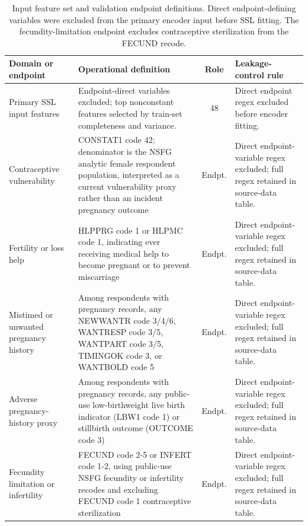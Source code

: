 \begin{table}[tbp]
\centering
\caption{Input feature set and validation endpoint definitions. Direct endpoint-defining variables were excluded from the primary encoder input before SSL fitting. The fecundity-limitation endpoint excludes contraceptive sterilization from the FECUND recode.}
\label{tab:endpoints}
\scriptsize
\setlength{\tabcolsep}{4pt}
\begin{tabular*}{\textwidth}{@{\extracolsep{\fill}}>{\raggedright\arraybackslash}p{}>{\raggedright\arraybackslash}p{}c>{\raggedright\arraybackslash}p{}@{}}
\toprule
Domain or endpoint & Operational definition & Role & Leakage-control rule \\
\midrule
Primary SSL input features & Endpoint-direct variables excluded; top nonconstant features selected by train-set completeness and variance. & 48 & Direct endpoint regex excluded before encoder fitting. \\
Contraceptive vulnerability & CONSTAT1 code 42; denominator is the NSFG analytic female respondent population, interpreted as a current vulnerability proxy rather than an incident pregnancy outcome & Endpt. & Direct endpoint-variable regex excluded; full regex retained in source-data table. \\
Fertility or loss help & HLPPRG code 1 or HLPMC code 1, indicating ever receiving medical help to become pregnant or to prevent miscarriage & Endpt. & Direct endpoint-variable regex excluded; full regex retained in source-data table. \\
Mistimed or unwanted pregnancy history & Among respondents with pregnancy records, any NEWWANTR code 3/4/6, WANTRESP code 3/5, WANTPART code 3/5, TIMINGOK code 3, or WANTBOLD code 5 & Endpt. & Direct endpoint-variable regex excluded; full regex retained in source-data table. \\
Adverse pregnancy-history proxy & Among respondents with pregnancy records, any public-use low-birthweight live birth indicator (LBW1 code 1) or stillbirth outcome (OUTCOME code 3) & Endpt. & Direct endpoint-variable regex excluded; full regex retained in source-data table. \\
Fecundity limitation or infertility & FECUND code 2-5 or INFERT code 1-2, using public-use NSFG fecundity or infertility recodes and excluding FECUND code 1 contraceptive sterilization & Endpt. & Direct endpoint-variable regex excluded; full regex retained in source-data table. \\
\bottomrule
\end{tabular*}
\end{table}
